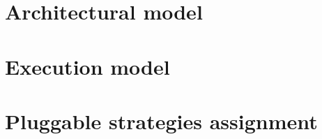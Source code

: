 \section{Architectural model}
\label{sec:model:architecture}


\section{Execution model}
\label{sec:model:execution}


\section{Pluggable strategies assignment}
\label{sec:model:strategies}
